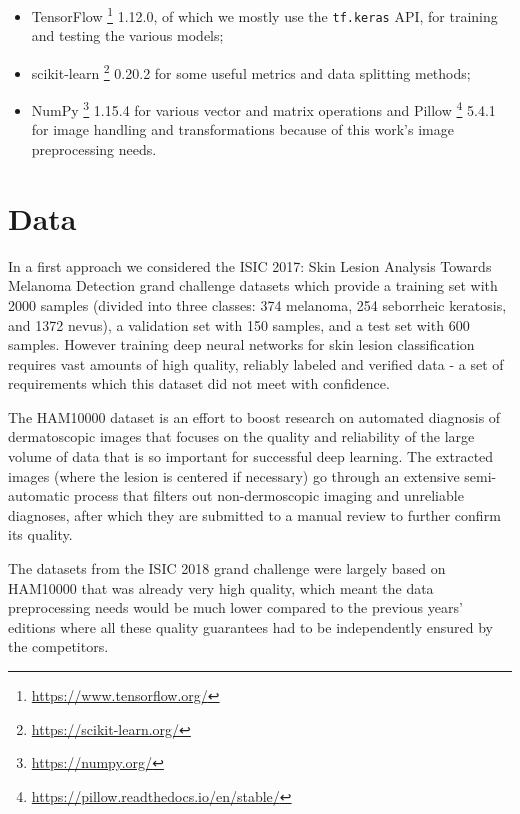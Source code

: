 \begin{itemize}
    \item TensorFlow \footnote{\url{https://www.tensorflow.org/}} 1.12.0, of which we mostly use the \verb|tf.keras| API, for training and testing the various models;
    \item scikit-learn \footnote{\url{https://scikit-learn.org/}} 0.20.2 for some useful metrics and data splitting methods;
    \item NumPy \footnote{\url{https://numpy.org/}} 1.15.4 for various vector and matrix operations and Pillow \footnote{\url{https://pillow.readthedocs.io/en/stable/}} 5.4.1 for image handling and transformations because of this work's image preprocessing needs.
\end{itemize}

\section{Data}

In a first approach we considered the ISIC 2017: Skin Lesion Analysis Towards Melanoma Detection grand challenge datasets \cite{isic2017} which provide a training set with 2000 samples (divided into three classes: 374 melanoma, 254 seborrheic keratosis, and 1372 nevus), a validation set with 150 samples, and a test set with 600 samples. However training deep neural networks for skin lesion classification requires vast amounts of high quality, reliably labeled and verified data - a set of requirements which this dataset did not meet with confidence.

The HAM10000 \cite{ham10000} dataset is an effort to boost research on automated diagnosis of dermatoscopic images that focuses on the quality and reliability of the large volume of data that is so important for successful deep learning. The extracted images (where the lesion is centered if necessary) go through an extensive semi-automatic process that filters out non-dermoscopic imaging and unreliable diagnoses, after which they are submitted to a manual review to further confirm its quality.

The datasets from the ISIC 2018 grand challenge \cite{isic2018} were largely based on HAM10000 that was already very high quality, which meant the data preprocessing needs would be much lower compared to the previous years' editions where all these quality guarantees had to be independently ensured by the competitors.

